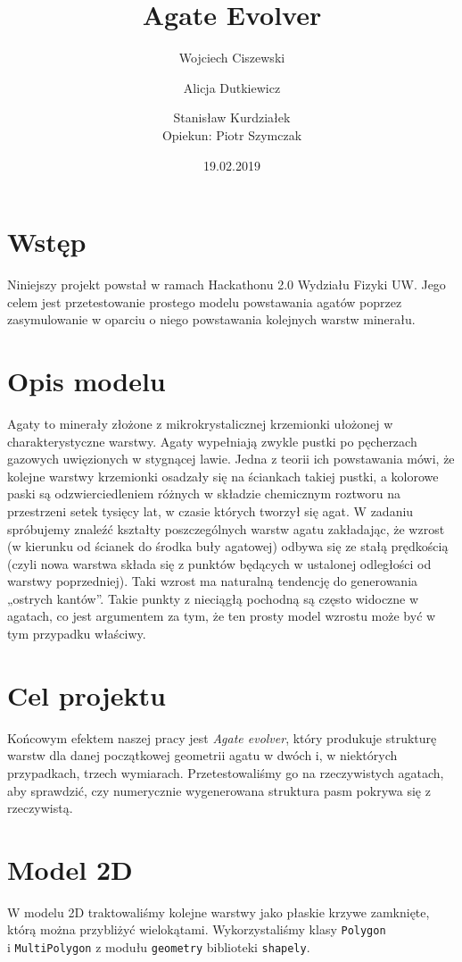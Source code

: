 \documentclass{article}
\title{Agate Evolver}
\author{Wojciech Ciszewski \and Alicja Dutkiewicz \and Stanisław Kurdziałek \\[1cm]{Opiekun: Piotr Szymczak}}
\date{19.02.2019}
\begin{document}
\maketitle
\section{Wstęp}
Niniejszy projekt powstał w ramach Hackathonu 2.0 Wydziału Fizyki UW. Jego celem jest przetestowanie prostego modelu powstawania agatów poprzez zasymulowanie w oparciu o niego powstawania kolejnych warstw minerału.
\section{Opis modelu}
Agaty to minerały złożone z mikrokrystalicznej krzemionki ułożonej w charakterystyczne warstwy. Agaty wypełniają zwykle pustki po pęcherzach gazowych uwięzionych w stygnącej lawie. Jedna z teorii ich powstawania mówi, że kolejne warstwy krzemionki osadzały się na ściankach takiej pustki, a kolorowe paski są odzwierciedleniem różnych w składzie chemicznym roztworu na przestrzeni setek tysięcy lat, w czasie których tworzył się agat.
W zadaniu spróbujemy znaleźć kształty poszczególnych warstw agatu zakładając, że wzrost (w kierunku od ścianek do środka buły agatowej) odbywa się ze stałą prędkością (czyli nowa warstwa składa się z punktów będących w ustalonej odległości od warstwy poprzedniej). Taki wzrost ma naturalną tendencję do generowania „ostrych kantów”. Takie punkty z nieciągłą pochodną są często widoczne w agatach, co jest argumentem za tym, że ten prosty model wzrostu może być w tym przypadku właściwy.
\section{Cel projektu}
Końcowym efektem naszej pracy jest \textit{Agate evolver}, który produkuje strukturę warstw dla danej początkowej geometrii agatu w dwóch i, w niektórych przypadkach, trzech wymiarach. Przetestowaliśmy go na rzeczywistych agatach, aby sprawdzić, czy numerycznie wygenerowana struktura pasm pokrywa się z rzeczywistą.
\section{Model 2D}
W modelu 2D traktowaliśmy kolejne warstwy jako płaskie krzywe zamknięte, którą można przybliżyć wielokątami. Wykorzystaliśmy klasy \texttt{Polygon}\\
i \texttt{MultiPolygon} z modułu \texttt{geometry} biblioteki \texttt{shapely}.
\end{document}

